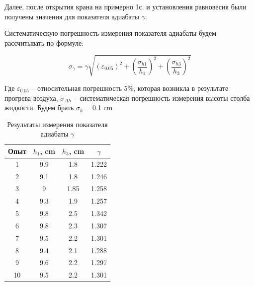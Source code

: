 \documentclass[a4paper,12pt]{report}
\begin{document}
    Далее, после открытия крана на примерно 1с. и установления равновесия были получены значения для показателя адиабаты $\gamma$.

    \begin{figure}
        
        
    \end{figure}

    Систематическую погрешность измерения показателя адиабаты будем рассчитывать по формуле:

    \begin{equation}
        \label{sigma gamma}
        \sigma_\gamma=\gamma\sqrt{\left(\varepsilon_{0.05}\right)^2+\left(\frac{\sigma_{h1}}{h_1}\right)^2+\left(\frac{\sigma_{{h3}}}{h_3}\right)^2}
    \end{equation}

    Где $\varepsilon_{0.05}$ -- относительная погрешность 5\%, которая возникла в результате прогрева воздуха, $\sigma_{\Delta h}$ -- систематическая погрешность измерения высоты столба жидкости. Будем брать $\sigma_{h}=$0.1 cm

    \begin{table}[H]
        \centering
        \begin{tabular}{|c|c|c|c|}
            \hline
            Опыт & $h_1$, cm & $h_3$, cm & $\gamma$ \\
            \hline
            1 & 9.9 & 1.8 & 1.222 \\
            \hline
            2 & 9.1 & 1.8 & 1.246 \\
            \hline
            3 & 9 & 1.85 & 1.258 \\
            \hline
            4 & 9.3 & 1.9 & 1.257 \\
            \hline
            5 & 9.8 & 2.5 & 1.342 \\
            \hline
            6 & 9.8 & 2.3 & 1.307 \\
            \hline
            7 & 9.5 & 2.2 & 1.301 \\
            \hline
            8 & 9.4 & 2.1 & 1.288 \\
            \hline
            9 & 9.6 & 2.2 & 1.297 \\
            \hline
            10 & 9.5 & 2.2 & 1.301 \\
            \hline
        \end{tabular}
        \caption{Результаты измерения показателя адиабаты $\gamma$}
    \end{table}
\end{document}
